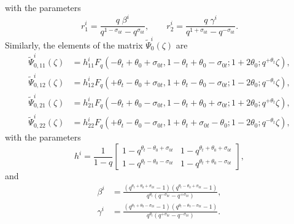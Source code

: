\documentclass[a4paper,reqno,11pt]{amsart}
\numberwithin{equation}{section}
\numberwithin{figure}{section}
\theoremstyle{plain}
\theoremstyle{remark}
\numberwithin{rhp}{section}
\begin{document}
with the parameters
\begin{equation*}
    r_1^i=\frac{q\;\beta^i}{q^{1-\sigma_{0t}}-q^{\sigma_{0t}}}, \qquad  r_2^i=\frac{q\;\gamma^i}{q^{1+\sigma_{0t}}-q^{-\sigma_{0t}}}.
\end{equation*}
Similarly, the elements of the matrix $\widetilde{\Psi}_{0}^i(\zeta)$ are
\begin{align*}
\widetilde{\Psi}_{0,{11}}^i(\zeta)&= h_{11}^iF_q\left(-\theta_t+\theta_0+\sigma_{0t},1-\theta_t+\theta_0-\sigma_{0t};1+2\theta_0;
q^{+\theta_t}\zeta\right),\\
\widetilde{\Psi}_{0,{12}}^i(\zeta)&= h_{12}^iF_q\left(+\theta_t-\theta_0+\sigma_{0t},1+\theta_t-\theta_0-\sigma_{0t};1-2\theta_0;
q^{-\theta_t}\zeta\right),\\
\widetilde{\Psi}_{0,{21}}^i(\zeta)&= h_{21}^iF_q\left(-\theta_t+\theta_0-\sigma_{0t},1-\theta_t+\theta_0+\sigma_{0t};1+2\theta_0;
q^{+\theta_t}\zeta\right),\\
\widetilde{\Psi}_{0,{22}}^i(\zeta)&= h_{22}^iF_q\left(+\theta_t-\theta_0-\sigma_{0t},1+\theta_t+\sigma_{0t}-\theta_0;1-2\theta_0;
q^{-\theta_t}\zeta\right),
\end{align*}
with the parameters
\begin{equation}\label{eq:matrixhi}
h^i=\frac{1}{1-q}\begin{bmatrix}
1-q^{\theta_t-\theta_0+\sigma_{0t}} & 1-q^{\theta_t+\theta_0+\sigma_{0t}}\\
1-q^{\theta_t-\theta_0-\sigma_{0t}} & 1-q^{\theta_t+\theta_0-\sigma_{0t}}
\end{bmatrix},
\end{equation}
and
\begin{align}
\beta^i&=\frac{(q^{\theta_t+\theta_0+\sigma_{0t}}-1)(q^{\theta_t-\theta_0+\sigma_{0t}}-1)}{q^{\theta_t}(q^{-\sigma_{0t}}-q^{+\sigma_{0t}})},\label{eq:betai}\\
\gamma^i&=\frac{(q^{\theta_t+\theta_0-\sigma_{0t}}-1)(q^{\theta_t-\theta_0-\sigma_{0t}}-1)}{q^{\theta_t}(q^{+\sigma_{0t}}-q^{-\sigma_{0t}})}.\nonumber
\end{align}
\end{document}
